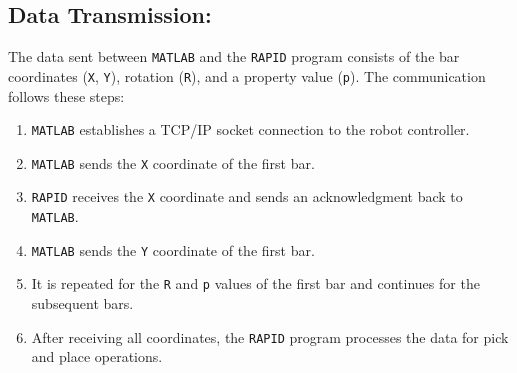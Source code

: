 \subsection{Data Transmission:}
The data sent between \texttt{MATLAB} and the \texttt{RAPID} program consists of the bar coordinates (\texttt{X}, \texttt{Y}), rotation (\texttt{R}), and a property value (\texttt{p}). The communication follows these steps:
\begin{enumerate}
    \item \texttt{MATLAB} establishes a TCP/IP socket connection to the robot controller.
    \item \texttt{MATLAB} sends the \texttt{X} coordinate of the first bar.
    \item \texttt{RAPID} receives the \texttt{X} coordinate and sends an acknowledgment back to \texttt{MATLAB}.
    \item \texttt{MATLAB} sends the \texttt{Y} coordinate of the first bar.
    \item It is repeated for the \texttt{R} and \texttt{p} values of the first bar and continues for the subsequent bars.
    \item After receiving all coordinates, the \texttt{RAPID} program processes the data for pick and place operations.
\end{enumerate}

